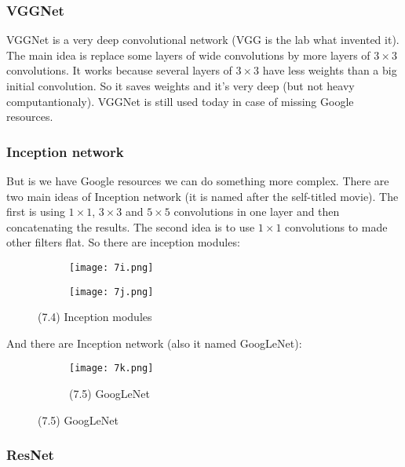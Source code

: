 \subsubsection*{VGGNet}

VGGNet is a very deep convolutional network (VGG is the lab what invented it). The main idea is replace some layers of wide convolutions by more layers of $3\times3$ convolutions. It works because several layers of $3\times3$ have less weights than a big initial convolution. So it saves weights and it's very deep (but not heavy computantionaly). VGGNet is still used today in case of missing Google resources.

\subsubsection*{Inception network}

But is we have Google resources we can do something more complex. There are two main ideas of Inception network (it is named after the self-titled movie). The first is using $1\times1$, $3\times3$ and $5\times5$ convolutions in one layer and then concatenating the results. The second idea is to use $1\times1$ convolutions to made other filters flat. So there are inception modules:\\
\begin{figure}[h]
  \centering
  \begin{subfigure}[l]{0.4\linewidth}
    \texttt{[image: 7i.png]}
  \end{subfigure}
  \hspace{0.5cm}
  \begin{subfigure}[r]{0.4\linewidth}
    \texttt{[image: 7j.png]}
  \end{subfigure}
  \caption*{(7.4) Inception modules}
\end{figure}
And there are Inception network (also it named GoogLeNet):
\begin{figure}[h]
  \centering
  \begin{subfigure}[c]{0.7\linewidth}
    \texttt{[image: 7k.png]}
    \caption*{(7.5) GoogLeNet}
  \end{subfigure}
\end{figure}

\vspace{-0.5cm}
\subsubsection*{ResNet}

